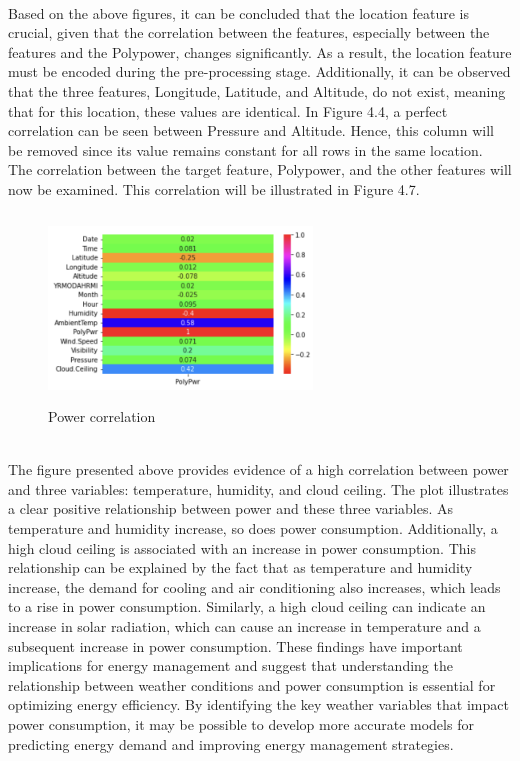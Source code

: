 \documentclass{report}
\begin{document}
\\
Based on the above figures, it can be concluded that the location feature is crucial, given that the correlation between the features, especially between the features and the Polypower, changes significantly. As a result, the location feature must be encoded during the pre-processing stage. Additionally, it can be observed that the three features, Longitude, Latitude, and Altitude, do not exist, meaning that for this location, these values are identical. In Figure 4.4, a perfect correlation can be seen between Pressure and Altitude. Hence, this column will be removed since its value remains constant for all rows in the same location.\hfill \break 
\\ 
The correlation between the target feature, Polypower, and the other features will now be examined. This correlation will be illustrated in Figure 4.7.
\begin{figure}[h!]
  \centering
    \includegraphics[width=7cm, height=5cm] {polycorr.png}
    \caption{Power correlation}
    \label{fig:my_label}
\end{figure}\hfill \break
\\
The figure presented above provides evidence of a high correlation between power and three variables: temperature, humidity, and cloud ceiling. The plot illustrates a clear positive relationship between power and these three variables. As temperature and humidity increase, so does power consumption. Additionally, a high cloud ceiling is associated with an increase in power consumption. This relationship can be explained by the fact that as temperature and humidity increase, the demand for cooling and air conditioning also increases, which leads to a rise in power consumption. Similarly, a high cloud ceiling can indicate an increase in solar radiation, which can cause an increase in temperature and a subsequent increase in power consumption. These findings have important implications for energy management and suggest that understanding the relationship between weather conditions and power consumption is essential for optimizing energy efficiency. By identifying the key weather variables that impact power consumption, it may be possible to develop more accurate models for predicting energy demand and improving energy management strategies.
\end{document}

